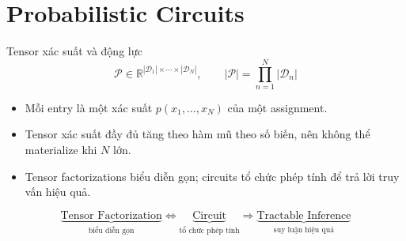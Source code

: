 \section{Probabilistic Circuits}

\begin{frame}{Tensor xác suất và động lực}
\[
    \mathcal{P}\in
    \mathbb{R}^{|\mathcal{D}_1|\times\cdots\times|\mathcal{D}_N|},
    \qquad
    |\mathcal{P}|=\prod_{n=1}^{N}|\mathcal{D}_n|
\]
\begin{itemize}
    \item Mỗi entry là một xác suất $p(x_1,\ldots,x_N)$ của một assignment.
    \item Tensor xác suất đầy đủ tăng theo hàm mũ theo số biến, nên không thể materialize khi $N$ lớn.
    \item Tensor factorizations biểu diễn gọn; circuits tổ chức phép tính để trả lời truy vấn hiệu quả.
\end{itemize}
\[
    \underbrace{\text{Tensor Factorization}}_{\text{biểu diễn gọn}}
    \Longleftrightarrow
    \underbrace{\text{Circuit}}_{\text{tổ chức phép tính}}
    \Longrightarrow
    \underbrace{\text{Tractable Inference}}_{\text{suy luận hiệu quả}}
\]
\end{frame}

